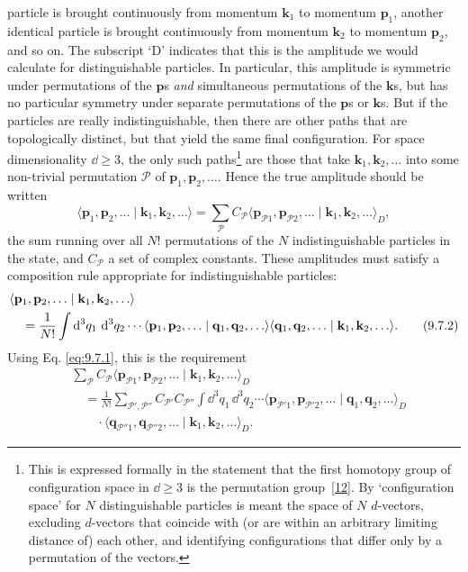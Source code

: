 particle is brought continuously from momentum $\mathbf k_1$ to momentum
$\mathbf p_1$, another identical particle is brought continuously from
momentum $\mathbf k_2$ to momentum $\mathbf p_2$, and so on. The subscript `D'
indicates that this is the amplitude we would calculate for distinguishable
particles. In particular, this amplitude is symmetric under permutations of
the $\mathbf p$s \emph{and} simultaneous permutations of the $\mathbf k$s, but
has no particular symmetry under separate permutations of the $\mathbf p$s or
$\mathbf k$s. But if the particles are really indistinguishable, then there are
other paths that are topologically distinct, but that yield the same final
configuration. For space dimensionality $\dd\geq3$, the only such
paths\footnote{This is expressed formally in the statement that the first
homotopy group of configuration space in $\dd\geq3$ is the permutation
group~\hyperref[ref:9.12]{[12]}. By `configuration space' for $N$ distinguishable particles is
meant the space of $N$ $d$-vectors, excluding $d$-vectors that coincide with
(or are within an arbitrary limiting distance of) each other, and identifying
configurations that differ only by a permutation of the vectors.} are those
that take $\mathbf k_1,\mathbf k_2,\ldots$ into some non-trivial permutation
$\mathcal P$ of $\mathbf p_1,\mathbf p_2,\ldots$. Hence the true amplitude
should be written
\begin{equation}
\langle\mathbf p_1,\mathbf p_2,\ldots\mid
 \mathbf k_1,\mathbf k_2,\ldots\rangle
=\sum_{\mathcal P}C_{\mathcal P}
 \langle\mathbf p_{\mathcal P1},\mathbf p_{\mathcal P2},\ldots\mid
 \mathbf k_1,\mathbf k_2,\ldots\rangle_D,
\tag{9.7.1}\label{eq:9.7.1}
\end{equation}
the sum running over all $N!$ permutations of the $N$ indistinguishable
particles in the state, and $C_{\mathcal P}$ a set of complex constants. These
amplitudes must satisfy a composition rule appropriate for indistinguishable
particles:
\begin{align}
&\langle\mathbf p_1,\mathbf p_2,\ldots\mid
 \mathbf k_1,\mathbf k_2,\ldots\rangle
\notag\\
&\quad=\frac{1}{N!}\int \mathop{}\!\mathrm{d}^3q_1\,\mathop{}\!\mathrm{d}^3q_2\cdots
 \langle\mathbf p_1,\mathbf p_2,\ldots\mid
 \mathbf q_1,\mathbf q_2,\ldots\rangle
 \langle\mathbf q_1,\mathbf q_2,\ldots\mid
 \mathbf k_1,\mathbf k_2,\ldots\rangle.
\tag{9.7.2}\label{eq:9.7.2}
\end{align}
Using Eq. \eqref{eq:9.7.1}, this is the requirement
\begin{align*}
&\sum_{\mathcal P}C_{\mathcal P}
 \langle\mathbf p_{\mathcal P1},\mathbf p_{\mathcal P2},\ldots\mid
 \mathbf k_1,\mathbf k_2,\ldots\rangle_D
\\
&\quad=\frac{1}{N!}\sum_{\mathcal P',\mathcal P''}
 C_{\mathcal P'}C_{\mathcal P''}\int \dd^3q_1\,\dd^3q_2\cdots
 \langle\mathbf p_{\mathcal P'1},\mathbf p_{\mathcal P'2},\ldots\mid
 \mathbf q_1,\mathbf q_2,\ldots\rangle_D
\\
&\qquad\cdot
 \langle\mathbf q_{\mathcal P''1},\mathbf q_{\mathcal P''2},\ldots\mid
 \mathbf k_1,\mathbf k_2,\ldots\rangle_D.
\end{align*}
